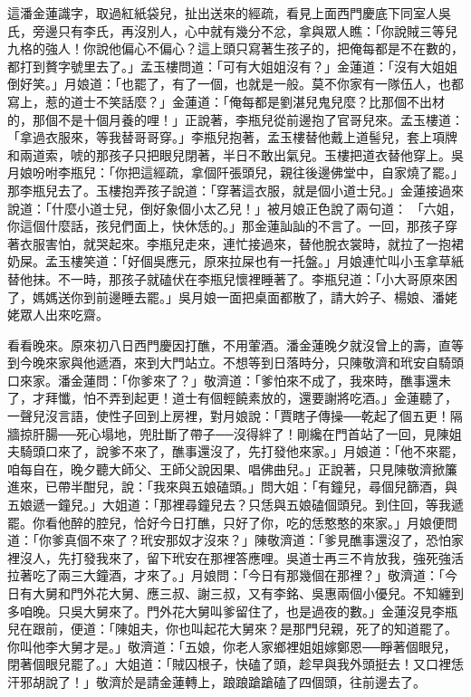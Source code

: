 這潘金蓮識字，取過紅紙袋兒，扯出送來的經疏，看見上面西門慶底下同室人吳氏，旁邊只有李氏，再沒別人，心中就有幾分不忿，拿與眾人瞧：「你說賊三等兒九格的強人！你說他偏心不偏心？這上頭只寫著生孩子的，把俺每都是不在數的，都打到贅字號里去了。」孟玉樓問道：「可有大姐姐沒有？」金蓮道：「沒有大姐姐倒好笑。」月娘道：「也罷了，有了一個，也就是一般。莫不你家有一隊伍人，也都寫上，惹的道士不笑話麼？」金蓮道：「俺每都是劉湛兒鬼兒麼？比那個不出材的，那個不是十個月養的哩！」正說著，李瓶兒從前邊抱了官哥兒來。孟玉樓道：「拿過衣服來，等我替哥哥穿。」李瓶兒抱著，孟玉樓替他戴上道髻兒，套上項牌和兩道索，唬的那孩子只把眼兒閉著，半日不敢出氣兒。玉樓把道衣替他穿上。吳月娘吩咐李瓶兒：「你把這經疏，拿個阡張頭兒，親往後邊佛堂中，自家燒了罷。」那李瓶兒去了。玉樓抱弄孩子說道：「穿著這衣服，就是個小道士兒。」金蓮接過來說道：「什麼小道士兒，倒好象個小太乙兒！」被月娘正色說了兩句道： 「六姐，你這個什麼話，孩兒們面上，快休恁的。」那金蓮訕訕的不言了。一回，那孩子穿著衣服害怕，就哭起來。李瓶兒走來，連忙接過來，替他脫衣裳時，就拉了一抱裙奶屎。孟玉樓笑道：「好個吳應元，原來拉屎也有一托盤。」月娘連忙叫小玉拿草紙替他抹。不一時，那孩子就磕伏在李瓶兒懷裡睡著了。李瓶兒道：「小大哥原來困了，媽媽送你到前邊睡去罷。」吳月娘一面把桌面都散了，請大妗子、楊娘、潘姥姥眾人出來吃齋。

看看晚來。原來初八日西門慶因打醮，不用葷酒。潘金蓮晚夕就沒曾上的壽，直等到今晚來家與他遞酒，來到大門站立。不想等到日落時分，只陳敬濟和玳安自騎頭口來家。潘金蓮問：「你爹來了？」敬濟道：「爹怕來不成了，我來時，醮事還未了，才拜懺，怕不弄到起更！道士有個輕饒素放的，還要謝將吃酒。」金蓮聽了，一聲兒沒言語，使性子回到上房裡，對月娘說：「賈瞎子傳操──乾起了個五更！隔牆掠肝腸──死心塌地，兜肚斷了帶子──沒得絆了！剛纔在門首站了一回，見陳姐夫騎頭口來了，說爹不來了，醮事還沒了，先打發他來家。」月娘道：「他不來罷，咱每自在，晚夕聽大師父、王師父說因果、唱佛曲兒。」正說著，只見陳敬濟掀簾進來，已帶半酣兒，說：「我來與五娘磕頭。」問大姐：「有鐘兒，尋個兒篩酒，與五娘遞一鐘兒。」大姐道：「那裡尋鐘兒去？只恁與五娘磕個頭兒。到住回，等我遞罷。你看他醉的腔兒，恰好今日打醮，只好了你，吃的恁憨憨的來家。」月娘便問道：「你爹真個不來了？玳安那奴才沒來？」陳敬濟道：「爹見醮事還沒了，恐怕家裡沒人，先打發我來了，留下玳安在那裡答應哩。吳道士再三不肯放我，強死強活拉著吃了兩三大鐘酒，才來了。」月娘問：「今日有那幾個在那裡？」敬濟道：「今日有大舅和門外花大舅、應三叔、謝三叔，又有李銘、吳惠兩個小優兒。不知纏到多咱晚。只吳大舅來了。門外花大舅叫爹留住了，也是過夜的數。」金蓮沒見李瓶兒在跟前，便道：「陳姐夫，你也叫起花大舅來？是那門兒親，死了的知道罷了。你叫他李大舅才是。」敬濟道：「五娘，你老人家鄉裡姐姐嫁鄭恩──睜著個眼兒，閉著個眼兒罷了。」大姐道：「賊囚根子，快磕了頭，趁早與我外頭挺去！又口裡恁汗邪胡說了！」敬濟於是請金蓮轉上，踉踉蹌蹌磕了四個頭，往前邊去了。

